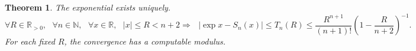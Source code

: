 \documentclass[11pt,reqno]{amsart}
\theoremstyle{redplain}
\newtheorem{theorem}{Theorem}[section]
\numberwithin{equation}{section}
\begin{document}
\label{sec:constructive}

\begin{theorem}
\label{thm:uniform-tail} The exponential exists uniquely. {\scriptsize 
\begin{equation}
\forall R\in 
\mathbb{R}
_{>0},\text{ }\forall n\in 
\mathbb{N}
,\text{ }\forall x\in 
\mathbb{R}
,\text{ }|x|\leq R<n+2\Rightarrow \text{ }|\exp x-S_{n}(x)|\leq T_{n}(R)\leq 
\frac{R^{n+1}}{(n+1)!}\left( 1-\frac{R}{n+2}\right) ^{-1}.
\label{eq:uniform-tail}
\end{equation}%
} For each fixed $R$, the convergence has a computable modulus.
\end{theorem}
\end{document}
